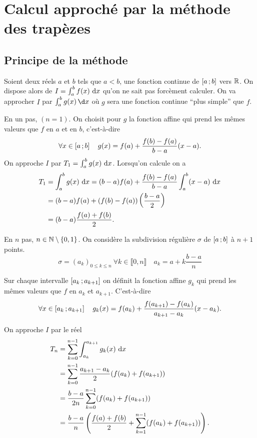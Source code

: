 \section{Calcul approché par la méthode des trapèzes}

\subsection{Principe de la méthode}

Soient deux réels \(a\) et \(b\) tels que \(a<b\), une fonction continue de
\(\left[ a \, ; {} b \right]\) vers \(\mathbb{R}\). On dispose alors de \(I = \int_a^b
f(x)\,\mathop{}\mathopen{}\mathrm{d} x\) qu'on ne sait pas forcèment calculer. On va approcher \(I\) par
\(\int_a^bg(x)\,\d x\) où \(g\) sera une fonction continue ``plus simple'' que
\(f\).

En un pas, \((n = 1)\). On choisit pour \(g\) la fonction affine qui prend les
mêmes valeurs que \(f\) en \(a\) et en \(b\), c'est-à-dire
\begin{equation}
  \forall x \in \left[ a \, ; {} b \right] \quad g(x) = f(a)
  +\frac{f(b)-f(a)}{b-a}(x-a).
\end{equation}
On approche \(I\) par \(T_1 = \int_a^bg(x)\,\mathop{}\mathopen{}\mathrm{d} x\). Lorsqu'on calcule on a
\begin{align*}
  T_1& = \int_a^bg(x)\,\mathop{}\mathopen{}\mathrm{d} x = (b-a)f(a) + \frac{f(b)-f(a)}{b-a} \int_a^b
  (x-a)\,\mathop{}\mathopen{}\mathrm{d} x \\
  & = (b-a)f(a) + (f(b)-f(a))\left(\frac{b-a}{2}\right)\\
  & = (b-a) \frac{f(a)+f(b)}{2}.
\end{align*}

En \(n\) pas, \(n \in \mathbb{N}\setminus\{0,1\}\). On considère la subdivision
régulière \(\sigma\) de \(\left[ a \, ; {} b \right]\) à \(n+1\) points.
\begin{equation}
  \sigma = (a_k)_{0 \leqslant k \leqslant n} \ \forall k \in \llbracket 0,n
  \rrbracket \quad a_k = a+ k \frac{b-a}{n}
\end{equation}

Sur chaque intervalle \(\left[ a_k \, ; {} a_{k+1} \right]\) on définit la fonction
affine \(g_k\) qui prend les mêmes valeurs que \(f\) en \(a_k\) et \(a_{k+1}\).
C'est-à-dire
\begin{equation}
  \forall x \in \left[ a_k \, ; {} a_{k+1} \right] \quad g_k(x) = f(a_k) +
  \frac{f(a_{k+1})-f(a_k)}{a_{k+1}-a_k}(x-a_{k}).
\end{equation}

On approche \(I\) par le réel
\begin{align*}
  T_n &= \sum_{k = 0}^{n-1} \int_{a_k}^{a_{k+1}} g_k(x)\,\mathop{}\mathopen{}\mathrm{d} x \\
  &= \sum_{k = 0}^{n-1} \frac{a_{k+1}-a_k}{2}(f(a_k)+f(a_{k+1}))\\
  & = \frac{b-a}{2n}  \sum_{k = 0}^{n-1}(f(a_k)+f(a_{k+1})) \\
  & = \frac{b-a}{n} \left(\frac{f(a)+f(b)}{2} +
  \sum_{k = 1}^{n-1}(f(a_k)+f(a_{k+1})) \right).
\end{align*}

